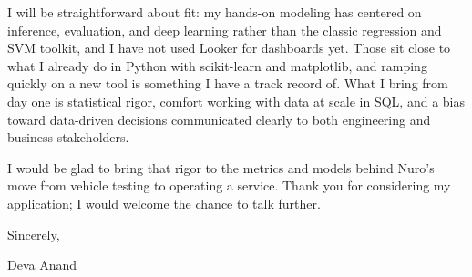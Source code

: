 \documentclass[letterpaper,11pt]{article}
\begin{document}
I will be straightforward about fit: my hands-on modeling has centered on inference, evaluation, and deep learning rather than the classic regression and SVM toolkit, and I have not used Looker for dashboards yet. Those sit close to what I already do in Python with scikit-learn and matplotlib, and ramping quickly on a new tool is something I have a track record of. What I bring from day one is statistical rigor, comfort working with data at scale in SQL, and a bias toward data-driven decisions communicated clearly to both engineering and business stakeholders.

I would be glad to bring that rigor to the metrics and models behind Nuro's move from vehicle testing to operating a service. Thank you for considering my application; I would welcome the chance to talk further.

\vspace{6pt}

Sincerely,

\vspace{4pt}

Deva Anand
\end{document}
